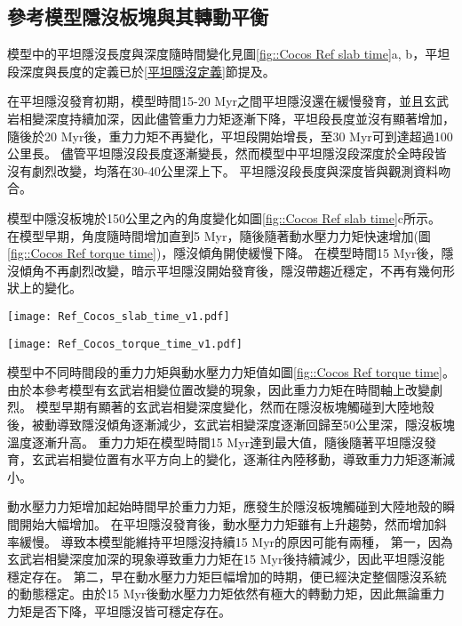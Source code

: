 \newpage
\subsection{參考模型隱沒板塊與其轉動平衡}
模型中的平坦隱沒長度與深度隨時間變化見圖\ref{fig::Cocos Ref slab time}a, b，平坦段深度與長度的定義已於\ref{平坦隱沒定義}節提及。

在平坦隱沒發育初期，模型時間15-20 Myr之間平坦隱沒還在緩慢發育，並且玄武岩相變深度持續加深，因此儘管重力力矩逐漸下降，平坦段長度並沒有顯著增加，隨後於20 Myr後，重力力矩不再變化，平坦段開始增長，至30 Myr可到達超過100公里長。
儘管平坦隱沒段長度逐漸變長，然而模型中平坦隱沒段深度於全時段皆沒有劇烈改變，均落在30-40公里深上下。
平坦隱沒段長度與深度皆與觀測資料吻合。

模型中隱沒板塊於150公里之內的角度變化如圖\ref{fig::Cocos Ref slab time}c所示。
在模型早期，角度隨時間增加直到5 Myr，隨後隨著動水壓力力矩快速增加(圖\ref{fig::Cocos Ref torque time})，隱沒傾角開使緩慢下降。
在模型時間15 Myr後，隱沒傾角不再劇烈改變，暗示平坦隱沒開始發育後，隱沒帶趨近穩定，不再有幾何形狀上的變化。

\begin{figure*}[hb]
    \centering
    \texttt{[image: Ref\_Cocos\_slab\_time\_v1.pdf]}
    \caption[科克斯參考模型隱沒板塊狀態隨時間變化]{科克斯參考模型隱沒板塊狀態隨時間變化。}
    \label{fig::Cocos Ref slab time}
\end{figure*}

\begin{figure*}[h]
    \centering
    \texttt{[image: Ref\_Cocos\_torque\_time\_v1.pdf]}
    \caption[科克斯參考模型重力力矩與動水壓力矩隨時間變化]{科克斯參考模型重力力矩與動水壓力矩隨時間變化。}
    \label{fig::Cocos Ref torque time}
\end{figure*}

模型中不同時間段的重力力矩與動水壓力力矩值如圖\ref{fig::Cocos Ref torque time}。
由於本參考模型有玄武岩相變位置改變的現象，因此重力力矩在時間軸上改變劇烈。
模型早期有顯著的玄武岩相變深度變化，然而在隱沒板塊觸碰到大陸地殼後，被動導致隱沒傾角逐漸減少，玄武岩相變深度逐漸回歸至50公里深，隱沒板塊溫度逐漸升高。
重力力矩在模型時間15 Myr達到最大值，隨後隨著平坦隱沒發育，玄武岩相變位置有水平方向上的變化，逐漸往內陸移動，導致重力力矩逐漸減小。

動水壓力力矩增加起始時間早於重力力矩，應發生於隱沒板塊觸碰到大陸地殼的瞬間開始大幅增加。
在平坦隱沒發育後，動水壓力力矩雖有上升趨勢，然而增加斜率緩慢。
導致本模型能維持平坦隱沒持續15 Myr的原因可能有兩種，
第一，因為玄武岩相變深度加深的現象導致重力力矩在15 Myr後持續減少，因此平坦隱沒能穩定存在。
第二，早在動水壓力力矩巨幅增加的時期，便已經決定整個隱沒系統的動態穩定。由於15 Myr後動水壓力力矩依然有極大的轉動力矩，因此無論重力力矩是否下降，平坦隱沒皆可穩定存在。
